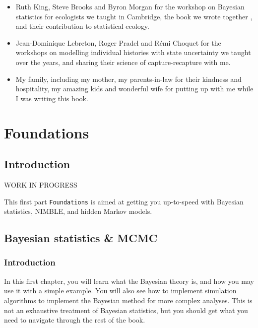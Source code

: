 \documentclass[
  12pt,
]{krantz}
\begin{document}
\begin{itemize}
\item
  Ruth King, Steve Brooks and Byron Morgan for the workshop on Bayesian statistics for ecologists we taught in Cambridge, the book we wrote together \citep{king_bayesian_2009}, and their contribution to statistical ecology.\\
\item
  Jean-Dominique Lebreton, Roger Pradel and Rémi Choquet for the workshops on modelling individual histories with state uncertainty we taught over the years, and sharing their science of capture-recapture with me.\\
\item
  My family, including my mother, my parents-in-law for their kindness and hospitality, my amazing kids and wonderful wife for putting up with me while I was writing this book.
\end{itemize}

\mainmatter

\part{Foundations}\label{part-foundations}

\chapter*{Introduction}\label{introduction}


WORK IN PROGRESS

This first part \texttt{Foundations} is aimed at getting you up-to-speed with Bayesian statistics, NIMBLE, and hidden Markov models.

\chapter{Bayesian statistics \& MCMC}\label{crashcourse}

\section{Introduction}\label{introduction-1}

In this first chapter, you will learn what the Bayesian theory is, and how you may use it with a simple example. You will also see how to implement simulation algorithms to implement the Bayesian method for more complex analyses. This is not an exhaustive treatment of Bayesian statistics, but you should get what you need to navigate through the rest of the book.
\end{document}
